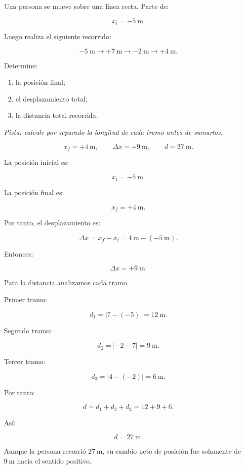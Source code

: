 \nivelintermedio


\begin{ejercicio}
Una persona se mueve sobre una línea recta. Parte de:

\[ x_i=-\SI{5}{\meter}. \]

Luego realiza el siguiente recorrido:

\[
-\SI{5}{\meter}
\longrightarrow
+\SI{7}{\meter}
\longrightarrow
-\SI{2}{\meter}
\longrightarrow
+\SI{4}{\meter}.
\]

Determine:

\begin{enumerate}[label=\alph*)]
    \item la posición final;
    \item el desplazamiento total;
    \item la distancia total recorrida.
\end{enumerate}

\textit{Pista: calcule por separado la longitud de cada tramo antes de sumarlos.}
\end{ejercicio}

\begin{respuesta}
\[
x_f=+\SI{4}{\meter},
\qquad
\Delta x=+\SI{9}{\meter},
\qquad
d=\SI{27}{\meter}.
\]
\end{respuesta}

\begin{explicacion}
La posición inicial es:

\[ x_i=-\SI{5}{\meter}. \]

La posición final es:

\[ x_f=+\SI{4}{\meter}. \]

Por tanto, el desplazamiento es:

\[
\Delta x
=
x_f-x_i
=
\SI{4}{\meter}
-
(-\SI{5}{\meter}).
\]

Entonces:

\[ \boxed{\Delta x=+\SI{9}{\meter}}. \]

Para la distancia analizamos cada tramo.

Primer tramo:

\[
d_1
=
|7-(-5)|
=
\SI{12}{\meter}.
\]

Segundo tramo:

\[
d_2
=
|-2-7|
=
\SI{9}{\meter}.
\]

Tercer tramo:

\[
d_3
=
|4-(-2)|
=
\SI{6}{\meter}.
\]

Por tanto:

\[
d=d_1+d_2+d_3
=
12+9+6.
\]

Así:

\[ \boxed{d=\SI{27}{\meter}}. \]

Aunque la persona recorrió \(\SI{27}{\meter}\), su cambio neto de posición fue solamente de \(\SI{9}{\meter}\) hacia el sentido positivo.
\end{explicacion}


